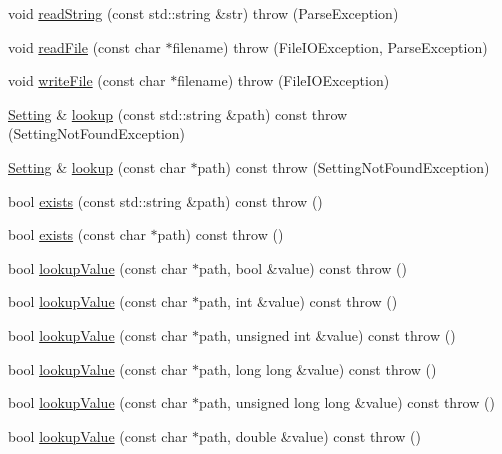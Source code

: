 \begin{DoxyCompactItemize}
void \hyperlink{classlibconfig_1_1Config_a19da31ba3ee31992a6ddbd6e079d629a}{read\-String} (const std\-::string \&str)  throw (\-Parse\-Exception)
\item 
void \hyperlink{classlibconfig_1_1Config_a31bc78ca36d4081560de025cbb08c022}{read\-File} (const char $\ast$filename)  throw (\-File\-I\-O\-Exception, Parse\-Exception)
\item 
void \hyperlink{classlibconfig_1_1Config_a9ee45e1ab444c2865bf076fbf4219326}{write\-File} (const char $\ast$filename)  throw (\-File\-I\-O\-Exception)
\item 
\hyperlink{classlibconfig_1_1Setting}{Setting} \& \hyperlink{classlibconfig_1_1Config_a0e7f37e3f8a08f35a77778de99515c6e}{lookup} (const std\-::string \&path) const   throw (\-Setting\-Not\-Found\-Exception)
\item 
\hyperlink{classlibconfig_1_1Setting}{Setting} \& \hyperlink{classlibconfig_1_1Config_adcfc1c6a6c7e43e5ac79d1e534fa0744}{lookup} (const char $\ast$path) const   throw (\-Setting\-Not\-Found\-Exception)
\item 
bool \hyperlink{classlibconfig_1_1Config_a1fa3eb517f8a6722b170322b5abdad15}{exists} (const std\-::string \&path) const   throw ()
\item 
bool \hyperlink{classlibconfig_1_1Config_a548166ff5b36227a295489a86c5024c8}{exists} (const char $\ast$path) const   throw ()
\item 
bool \hyperlink{classlibconfig_1_1Config_abbf777fd9ef13502f049c3cbd8e1742e}{lookup\-Value} (const char $\ast$path, bool \&value) const   throw ()
\item 
bool \hyperlink{classlibconfig_1_1Config_ae82a77068c32d45ac0a006343f6cbec8}{lookup\-Value} (const char $\ast$path, int \&value) const   throw ()
\item 
bool \hyperlink{classlibconfig_1_1Config_a1021af7dfe97eb838d9a9892bd5b8339}{lookup\-Value} (const char $\ast$path, unsigned int \&value) const   throw ()
\item 
bool \hyperlink{classlibconfig_1_1Config_a50124b872c6412045dca2c89a4a71cca}{lookup\-Value} (const char $\ast$path, long long \&value) const   throw ()
\item 
bool \hyperlink{classlibconfig_1_1Config_a9b6cda1b3a631f7f9c912405f96a3601}{lookup\-Value} (const char $\ast$path, unsigned long long \&value) const   throw ()
\item 
bool \hyperlink{classlibconfig_1_1Config_ac1d8313aba68010ec75a52e1f19cdd90}{lookup\-Value} (const char $\ast$path, double \&value) const   throw ()
\item 

\end{DoxyCompactItemize}
